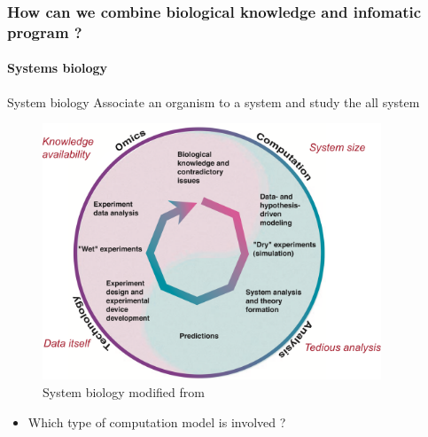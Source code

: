 \documentclass[8pt]{beamer}
\begin{document}
\begin{frame}
\frametitle{How can we combine biological knowledge and infomatic program ?}
\framesubtitle{Systems biology}
\begin{exampleblock}{System biology}
Associate an organism to a system and study the all system \tiny \citep{Kitano2002}
\end{exampleblock}
\begin{minipage}{0.8\textwidth}
\begin{figure}
\includegraphics[width=0.9\textwidth]{figures/systeme-biology.pdf}
\caption{System biology modified from \cite{Kitano2002}}
\end{figure}
\end{minipage}%
\hspace{-1.1cm}%
\begin{minipage}{0.3\textwidth}
\begin{block}{}
\begin{itemize}
\item Which type of computation model is involved ?
\end{itemize}
\end{block}
\end{minipage}
\end{frame}
\end{document}
